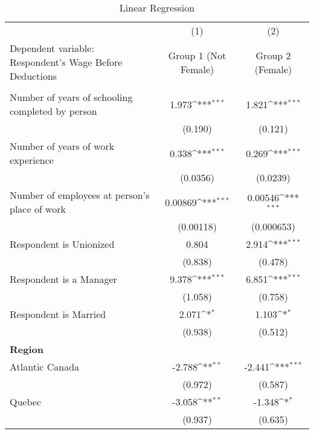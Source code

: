 \documentclass[11pt]{article}
\begin{document}
{
{
\begin{table}[t]
\caption{Linear Regression}
\centering
\def\sym#1{\ifmmode^{#1}\else\(^{#1}\)\fi}
\begin{tabular}{l*{2}{c}}
\hline\hline
            &\multicolumn{1}{c}{(1)}&\multicolumn{1}{c}{(2)}\\
Dependent variable: Respondent's Wage Before Deductions &\multicolumn{1}{c}{Group 1 (Not Female)}&\multicolumn{1}{c}{Group 2 (Female)}\\
\hline
\\
Number of years of schooling completed by person    &       1.973\sym{***}&       1.821\sym{***}\\
            &     (0.190)         &     (0.121)         \\
[1em]
Number of years of work experience  &       0.338\sym{***}&       0.269\sym{***}\\
            &    (0.0356)         &    (0.0239)         \\
[1em]
Number of employees at person's place of work&     0.00869\sym{***}&     0.00546\sym{***}\\
            &   (0.00118)         &  (0.000653)         \\
[1em]
Respondent is Unionized       &       0.804         &       2.914\sym{***}\\
            &     (0.838)         &     (0.478)         \\
[1em]
Respondent is a Manager    &       9.378\sym{***}&       6.851\sym{***}\\
            &     (1.058)         &     (0.758)         \\
[1em]
Respondent is Married     &       2.071\sym{*}  &       1.103\sym{*}  \\
            &     (0.938)         &     (0.512)         \\
[1em]
\textbf{Region}            &                  &                 \\            
[1em]
\hspace{\parindent} \hspace{\parindent}Atlantic Canada    &      -2.788\sym{**} &      -2.441\sym{***}\\
            &     (0.972)         &     (0.587)         \\
[1em]
\hspace{\parindent} \hspace{\parindent}Quebec    &      -3.058\sym{**} &      -1.348\sym{*}  \\
            &     (0.937)         &     (0.635)         \\

\end{tabular}
\end{table}}}
\end{document}
